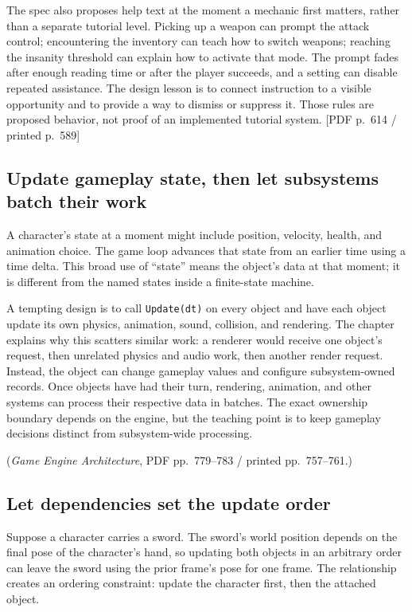 The spec also proposes help text at the moment a mechanic first matters, rather than a separate tutorial level. Picking up a weapon can prompt the attack control; encountering the inventory can teach how to switch weapons; reaching the insanity threshold can explain how to activate that mode. The prompt fades after enough reading time or after the player succeeds, and a setting can disable repeated assistance. The design lesson is to connect instruction to a visible opportunity and to provide a way to dismiss or suppress it. Those rules are proposed behavior, not proof of an implemented tutorial system. {[}PDF p.~614 / printed p.~589{]}

\subsection{Update gameplay state, then let subsystems batch their work}\label{05-engine-i-ch014-update-gameplay-state-then-let-subsystems-batch-their-work}

A character's state at a moment might include position, velocity, health, and animation choice. The game loop advances that state from an earlier time using a time delta. This broad use of ``state'' means the object's data at that moment; it is different from the named states inside a finite-state machine.

A tempting design is to call \texttt{Update(dt)} on every object and have each object update its own physics, animation, sound, collision, and rendering. The chapter explains why this scatters similar work: a renderer would receive one object's request, then unrelated physics and audio work, then another render request. Instead, the object can change gameplay values and configure subsystem-owned records. Once objects have had their turn, rendering, animation, and other systems can process their respective data in batches. The exact ownership boundary depends on the engine, but the teaching point is to keep gameplay decisions distinct from subsystem-wide processing.

(\emph{Game Engine Architecture}, PDF pp.~779--783 / printed pp.~757--761.)

\subsection{Let dependencies set the update order}\label{05-engine-i-ch014-let-dependencies-set-the-update-order}

Suppose a character carries a sword. The sword's world position depends on the final pose of the character's hand, so updating both objects in an arbitrary order can leave the sword using the prior frame's pose for one frame. The relationship creates an ordering constraint: update the character first, then the attached object.

